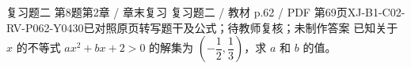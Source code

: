 \par\noindent\begin{minipage}{\linewidth}
\begin{bankitem}{复习题二 第8题}{第2章 / 章末复习 复习题二 / 教材 p.62 / PDF 第69页}{XJ-B1-C02-RV-P062-Y0430}{已对照原页转写题干及公式；待教师复核；未制作答案}
已知关于 $x$ 的不等式 $ax^2+bx+2>0$ 的解集为 $\left(-\dfrac12,\dfrac13\right)$，求 $a$ 和 $b$ 的值。
\end{bankitem}
\end{minipage}\par\medskip
